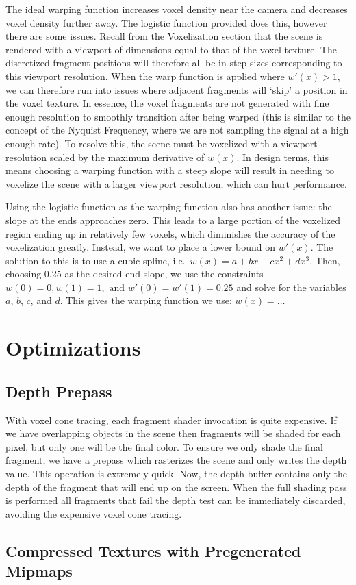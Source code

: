 The ideal warping function increases voxel density near the camera and decreases voxel density further away. The logistic function provided does this, however there are some issues. Recall from the Voxelization section that the scene is rendered with a viewport of dimensions equal to that of the voxel texture. The discretized fragment positions will therefore all be in step sizes corresponding to this viewport resolution. When the warp function is applied where $w'(x) > 1$, we can therefore run into issues where adjacent fragments will `skip' a position in the voxel texture. In essence, the voxel fragments are not generated with fine enough resolution to smoothly transition after being warped (this is similar to the concept of the Nyquist Frequency, where we are not sampling the signal at a high enough rate). To resolve this, the scene must be voxelized with a viewport resolution scaled by the maximum derivative of $w(x)$. In design terms, this means choosing a warping function with a steep slope will result in needing to voxelize the scene with a larger viewport resolution, which can hurt performance. %

Using the logistic function as the warping function also has another issue: the slope at the ends approaches zero. This leads to a large portion of the voxelized region ending up in relatively few voxels, which diminishes the accuracy of the voxelization greatly. %
Instead, we want to place a lower bound on $w'(x)$. The solution to this is to use a cubic spline, i.e.\ $w(x) = a + bx + cx^2 + dx^3$. Then, choosing 0.25 as the desired end slope, we use the constraints $w(0) = 0, w(1) = 1, \text{ and } w'(0) = w'(1) = 0.25$ and solve for the variables $a$, $b$, $c$, and $d$. This gives the warping function we use: $w(x) = \ldots$ %

 
\section{Optimizations}
\subsection{Depth Prepass}
With voxel cone tracing, each fragment shader invocation is quite expensive. If we have overlapping objects in the scene then fragments will be shaded for each pixel, but only one will be the final color. To ensure we only shade the final fragment, we have a prepass which rasterizes the scene and only writes the depth value. This operation is extremely quick. Now, the depth buffer contains only the depth of the fragment that will end up on the screen. When the full shading pass is performed all fragments that fail the depth test can be immediately discarded, avoiding the expensive voxel cone tracing.

\subsection{Compressed Textures with Pregenerated Mipmaps}

